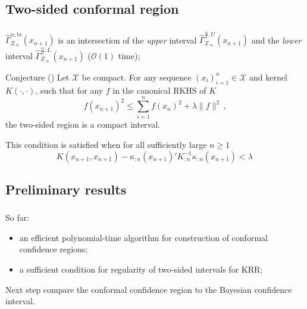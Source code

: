 \documentclass[t]{beamer}  %
\newcommand{\Xcal}{\mathcal{X}}
\newcommand{\Ocal}{\mathcal{O}}
\begin{document}

\subsection{Two-sided conformal region} %
\label{sub:two_sided_conformal_region}

\begin{frame}[c]\frametitle{\insertsection}
  \framesubtitle{\insertsubsection}
  $\hat{\Gamma}_{Z_{:n}}^{\alpha,\text{ts}}(x_{n+1})$ is an intersection of the
  \textit{upper} interval $\hat{\Gamma}_{Z_{:n}}^{\frac{\alpha}{2}, U}(x_{n+1})$ and the
  \textit{lower} interval $\hat{\Gamma}_{Z_{:n}}^{\frac{\alpha}{2}, L}(x_{n+1})$
  ($\Ocal(1)$ time);

  \vspace{\baselineskip}
  \begin{block}{Conjecture (\cite{burnaevV14})}
    Let $\Xcal$ be compact. For any sequence $(x_i)_{i=1}^n\in \Xcal$ and kernel
    $K(\cdot, \cdot)$, such that for any $f$ in the canonical RKHS of $K$
    $$ f(x_{n+1})^2 \leq \sum_{i=1}^n f(x_n)^2 + \lambda \|f\|^2 \,, $$
    the two-sided region is a compact interval.

    This condition is satisfied when for all sufficiently large $n\geq 1$
    $$ K(x_{n+1}, x_{n+1}) - \kappa_{:n}(x_{n+1})' K^{-1}_{:n} \kappa_{:n}(x_{n+1}) < \lambda \, $$
  \end{block}
\end{frame}


\subsection{Preliminary results} %
\label{sub:preliminary_results}

\begin{frame}[c]\frametitle{\insertsection}
  \framesubtitle{\insertsubsection}
  \begin{block}{So far:}
  \begin{itemize}
    \item an efficient polynomial-time algorithm for construction of conformal
    confidence regions;
    \item a sufficient condition for regularity of two-sided intervals for KRR;
  \end{itemize}
  \end{block}
  \begin{block}{Next step}
    compare the conformal confidence region to the Bayesian confidence interval.
  \end{block}
\end{frame}
\end{document}
